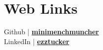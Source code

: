 \documentclass[]{deedy-resume-openfont}
\begin{document}
\begin{minipage}[t]{0.33\textwidth}

\section{Web Links}
Github | \href{https://github.com/minimenchmuncher}{\bf minimenchmuncher} \\
LinkedIn |  \href{https://www.linkedin.com/in/ezztucker}{\bf ezztucker} 
\sectionsep

%
%

\end{minipage} 
\hfill
\end{document}

